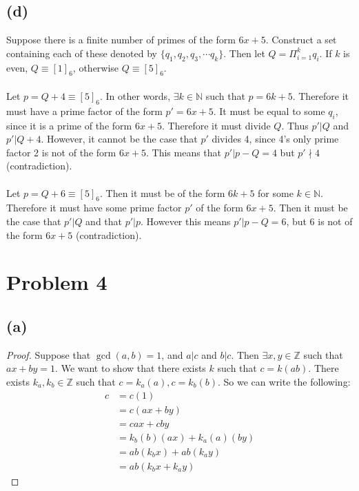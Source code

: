\documentclass{article}
\theoremstyle{definition}
\begin{document}
    \subsection*{(d)}
        Suppose there is a finite number of primes of the form $6x + 5$.
        Construct a set containing each of these denoted by $\{q_1,q_2,q_3, \cdots q_k\}$.
        Then let $Q = \Pi_{i = 1}^k q_i$. If $k$ is even, $Q \equiv [1]_6$, otherwise $Q \equiv [5]_6$. \\\\
         Let $p = Q + 4 \equiv [5]_6$. In other words, $\exists k \in \mathbb{N}$ such that
        $p = 6k + 5$. Therefore it must have a prime factor of the form $p' = 6x + 5$. It must be equal to some $q_i$,
        since it is a prime of the form $6x + 5$. Therefore it must divide $Q$. Thus $p' | Q$ and $p' | Q + 4$.
        However, it cannot be the case that $p'$ divides 4, since 4's only prime factor 2 is not of the form $6x + 5$.
        This means that $p' | p - Q = 4$ but $p' \nmid 4$ (contradiction).\\\\
         Let $p = Q + 6 \equiv [5]_6$. Then it must be of the form $6k + 5$ for some $k \in \mathbb{N}$.
        Therefore it must have some prime factor $p'$ of the form $6x + 5$. Then it must be the case that $p' | Q$ and that $p' | p$.
        However this means $p' | p - Q = 6$, but 6 is not of the form $6x + 5$ (contradiction).
\section*{Problem 4}
    \subsection*{(a)}
    \begin{proof}
        Suppose that $\gcd(a,b) = 1$, and $a | c$ and $b | c$.
        Then $\exists x,y \in \mathbb{Z}$ such that $ax + by = 1$.
        We want to show that there exists $k$ such that $c = k(ab)$.
        There exists $k_a, k_b \in \mathbb{Z}$ such that $c = k_a(a), c = k_b(b)$.
        So we can write the following:
        \begin{align*}
            c & = c(1) \\
            &= c(ax + by) \\
            &= cax + cby \\
            &= k_b(b)(ax) + k_a(a)(by) \\
            &= ab(k_b x) + ab(k_a y) \\
            &= ab(k_b x + k_a y)
        \end{align*}
    \end{proof}
\end{document}
